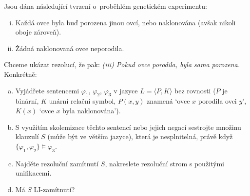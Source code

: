\begin{problem}

    Jsou dána následující tvrzení o~proběhlém genetickém experimentu:
    \begin{enumerate}[(i)]\it
        \item Každá ovce byla buď porozena jinou ovcí, nebo naklonována (avšak nikoli oboje zároveň).
        \item Žádná naklonovaná ovce neporodila.
    \end{enumerate}
    Chceme ukázat rezolucí, že pak: {\it (iii) Pokud ovce porodila, byla sama porozena.} Konkrétně:
    \begin{enumerate}[(a)]
        \item Vyjádřete sentencemi $\varphi_1$, $\varphi_2$, $\varphi_3$ v jazyce $L=\langle P,K\rangle$ bez rovnosti ($P$ je binární, $K$ unární relační symbol, $P(x,y)$ znamená `ovce $x$ porodila ovci $y$', $K(x)$ `ovce $x$ byla naklonována').
        \item S využitím skolemizace těchto sentencí nebo jejich negací sestrojte množinu klauzulí $S$ (může být ve větším jazyce), která je nesplnitelná, právě když  $\{\varphi_1, \varphi_2\} \models \varphi_3$. %
        \item Najděte rezoluční zamítnutí $S$, nakreslete rezoluční strom s použitými unifikacemi.
        \item Má $S$ LI-zamítnutí?
    \end{enumerate}


\end{problem}
